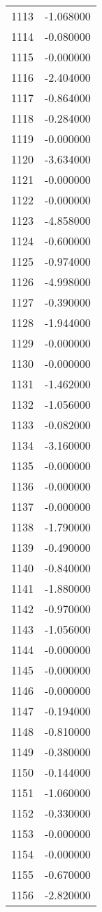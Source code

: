 \documentclass[12pt]{article}
\begin{document}
\begin{longtable}{@{}cc@{}}
1113 & -1.068000 \\
1114 & -0.080000 \\
1115 & -0.000000 \\
1116 & -2.404000 \\
1117 & -0.864000 \\
1118 & -0.284000 \\
1119 & -0.000000 \\
1120 & -3.634000 \\
1121 & -0.000000 \\
1122 & -0.000000 \\
1123 & -4.858000 \\
1124 & -0.600000 \\
1125 & -0.974000 \\
1126 & -4.998000 \\
1127 & -0.390000 \\
1128 & -1.944000 \\
1129 & -0.000000 \\
1130 & -0.000000 \\
1131 & -1.462000 \\
1132 & -1.056000 \\
1133 & -0.082000 \\
1134 & -3.160000 \\
1135 & -0.000000 \\
1136 & -0.000000 \\
1137 & -0.000000 \\
1138 & -1.790000 \\
1139 & -0.490000 \\
1140 & -0.840000 \\
1141 & -1.880000 \\
1142 & -0.970000 \\
1143 & -1.056000 \\
1144 & -0.000000 \\
1145 & -0.000000 \\
1146 & -0.000000 \\
1147 & -0.194000 \\
1148 & -0.810000 \\
1149 & -0.380000 \\
1150 & -0.144000 \\
1151 & -1.060000 \\
1152 & -0.330000 \\
1153 & -0.000000 \\
1154 & -0.000000 \\
1155 & -0.670000 \\
1156 & -2.820000 \\

\end{longtable}
\end{document}
